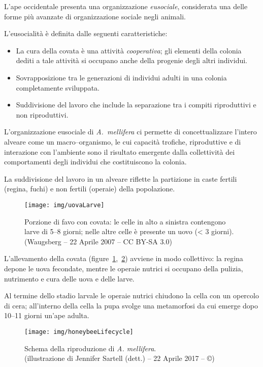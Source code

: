 L'ape occidentale presenta una organizzazione \emph{eusociale}, considerata una delle forme più
avanzate di organizzazione sociale negli animali.

L'eusocialità è definita dalle seguenti caratteristiche:
\begin{itemize}
    \item La cura della covata è una attività \emph{cooperativa}; gli elementi della colonia dediti a tale attività si occupano anche della progenie degli altri individui.
    \item Sovrapposizione tra le generazioni di individui adulti in una colonia completamente sviluppata.
    \item Suddivisione del lavoro che include la separazione tra i compiti riproduttivi e non riproduttivi.
\end{itemize}

L'organizzazione eusociale di \emph{A.~mellifera} ci permette di concettualizzare l'intero alveare come un macro--organismo, le cui capacità trofiche, riproduttive e di interazione con l'ambiente sono il risultato emergente dalla collettività dei comportamenti degli individui che costituiscono la colonia.

La suddivisione del lavoro in un alveare riflette la partizione in caste fertili (regina, fuchi) e non fertili (operaie) della popolazione.

\begin{figure}[hbp]
    \centering
    \texttt{[image: img/uovaLarve]}

    \caption[Covata giovane.]{Porzione di favo con covata: le celle in alto a sinistra contengono larve di 5--8 giorni; nelle altre celle è presente un uovo (< 3 giorni). \\ (Waugsberg -- 22 Aprile 2007 -- CC BY-SA 3.0)}
    \label{img:uovaLarve}
\end{figure}

L'allevamento della covata (figure~\ref{img:uovaLarve},~\ref{img:lifecycle}) avviene in modo collettivo: la regina depone le uova fecondate, mentre le operaie nutrici si occupano della pulizia, nutrimento e cura delle uova e delle larve.

Al termine dello stadio larvale le operaie nutrici chiudono la cella con un opercolo di cera; all'interno della cella la pupa svolge una metamorfosi da cui emerge dopo 10--11 giorni un'ape adulta.

\begin{figure}[hbp]
    \centering
    \texttt{[image: img/honeybeeLifecycle]}

    \caption[Ciclo vitale dell'ape.]{Schema della riproduzione di \emph{A. mellifera}.
        \\ (illustrazione di Jennifer Sartell (dett.) -- 22 Aprile 2017 -- ©)}
    \label{img:lifecycle}
\end{figure}

